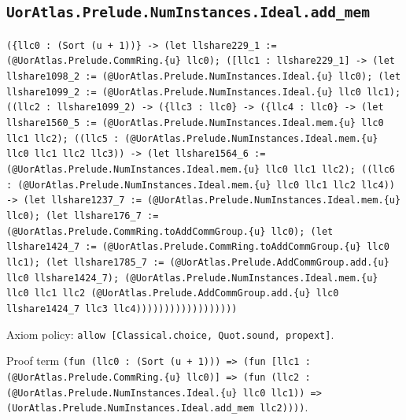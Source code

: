\documentclass[11pt]{article}
\begin{document}
\subsection*{\texttt{UorAtlas.Prelude.NumInstances.Ideal.add\_mem}}
\noindent\texttt{(\{llc0 : (Sort (u + 1))\} -> (let llshare229\_1 := (@UorAtlas.Prelude.CommRing.\{u\} llc0); ([llc1 : llshare229\_1] -> (let llshare1098\_2 := (@UorAtlas.Prelude.NumInstances.Ideal.\{u\} llc0); (let llshare1099\_2 := (@UorAtlas.Prelude.NumInstances.Ideal.\{u\} llc0 llc1); ((llc2 : llshare1099\_2) -> (\{llc3 : llc0\} -> (\{llc4 : llc0\} -> (let llshare1560\_5 := (@UorAtlas.Prelude.NumInstances.Ideal.mem.\{u\} llc0 llc1 llc2); ((llc5 : (@UorAtlas.Prelude.NumInstances.Ideal.mem.\{u\} llc0 llc1 llc2 llc3)) -> (let llshare1564\_6 := (@UorAtlas.Prelude.NumInstances.Ideal.mem.\{u\} llc0 llc1 llc2); ((llc6 : (@UorAtlas.Prelude.NumInstances.Ideal.mem.\{u\} llc0 llc1 llc2 llc4)) -> (let llshare1237\_7 := (@UorAtlas.Prelude.NumInstances.Ideal.mem.\{u\} llc0); (let llshare176\_7 := (@UorAtlas.Prelude.CommRing.toAddCommGroup.\{u\} llc0); (let llshare1424\_7 := (@UorAtlas.Prelude.CommRing.toAddCommGroup.\{u\} llc0 llc1); (let llshare1785\_7 := (@UorAtlas.Prelude.AddCommGroup.add.\{u\} llc0 llshare1424\_7); (@UorAtlas.Prelude.NumInstances.Ideal.mem.\{u\} llc0 llc1 llc2 (@UorAtlas.Prelude.AddCommGroup.add.\{u\} llc0 llshare1424\_7 llc3 llc4))))))))))))))))))}\par
\noindent Axiom policy: \texttt{allow [Classical.choice, Quot.sound, propext]}.\par
\noindent Proof term \texttt{(fun (llc0 : (Sort (u + 1))) => (fun [llc1 : (@UorAtlas.Prelude.CommRing.\{u\} llc0)] => (fun (llc2 : (@UorAtlas.Prelude.NumInstances.Ideal.\{u\} llc0 llc1)) => (UorAtlas.Prelude.NumInstances.Ideal.add\_mem llc2))))}.\par
\end{document}
